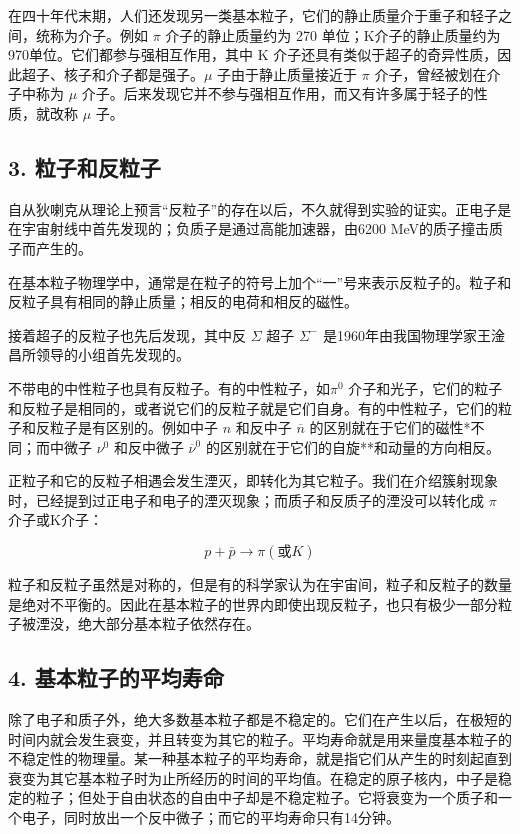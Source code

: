 在四十年代末期，人们还发现另一类基本粒子，它们的静止质量介于重子和轻子之间，统称为介子。例如
\(\pi\) 介子的静止质量约为 270
单位；K介子的静止质量约为970单位。它们都参与强相互作用，其中 K
介子还具有类似于超子的奇异性质，因此超子、核子和介子都是强子。\(\mu\)
子由于静止质量接近于 \(\pi\) 介子，曾经被划在介子中称为 \(\mu\)
介子。后来发现它并不参与强相互作用，而又有许多属于轻子的性质，就改称
\(\mu\) 子。

\subsection{3. 粒子和反粒子}

自从狄喇克从理论上预言``反粒子''的存在以后，不久就得到实验的证实。正电子是在宇宙射线中首先发现的；负质子是通过高能加速器，由6200
MeV的质子撞击质子而产生的。

在基本粒子物理学中，通常是在粒子的符号上加个``一''号来表示反粒子的。粒子和反粒子具有相同的静止质量；相反的电荷和相反的磁性。

接着超子的反粒子也先后发现，其中反 \(\Sigma\) 超子 \(\Sigma^{-}\)
是1960年由我国物理学家王淦昌所领导的小组首先发现的。

不带电的中性粒子也具有反粒子。有的中性粒子，如\(\pi^{0}\)
介子和光子，它们的粒子和反粒子是相同的，或者说它们的反粒子就是它们自身。有的中性粒子，它们的粒子和反粒子是有区别的。例如中子
\(n\) 和反中子 \(\overline{n}\) 的区别就在于它们的磁性*不同；而中微子
\(\nu^{0}\) 和反中微子 \(\overline{\nu}^{0}\)
的区别就在于它们的自旋**和动量的方向相反。

正粒子和它的反粒子相遇会发生湮灭，即转化为其它粒子。我们在介绍簇射现象时，已经提到过正电子和电子的湮灭现象；而质子和反质子的湮没可以转化成
\(\pi\) 介子或K介子：

\[
p + \bar {p} \longrightarrow \pi (\text{或} K)
\]

粒子和反粒子虽然是对称的，但是有的科学家认为在宇宙间，粒子和反粒子的数量是绝对不平衡的。因此在基本粒子的世界内即使出现反粒子，也只有极少一部分粒子被湮没，绝大部分基本粒子依然存在。

\subsection{4.
基本粒子的平均寿命}

除了电子和质子外，绝大多数基本粒子都是不稳定的。它们在产生以后，在极短的时间内就会发生衰变，并且转变为其它的粒子。平均寿命就是用来量度基本粒子的不稳定性的物理量。某一种基本粒子的平均寿命，就是指它们从产生的时刻起直到衰变为其它基本粒子时为止所经历的时间的平均值。在稳定的原子核内，中子是稳定的粒子；但处于自由状态的自由中子却是不稳定粒子。它将衰变为一个质子和一个电子，同时放出一个反中微子；而它的平均寿命只有14分钟。

